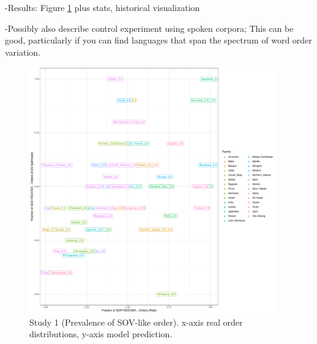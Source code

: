 \documentclass[11pt,a4paper]{article}
\begin{document}
-Results: Figure \ref{fig:study1} plus stats, historical visualization


-Possibly also describe control experiment using spoken corpora; {\color{blue} This can be good, particularly if you can find languages that span the spectrum of word order variation.}



\begin{figure}
    \centering
    \includegraphics[width=0.95\textwidth]{figures/fracion-optimized_DLM_2.6.pdf}
    \caption{Study 1 (Prevalence of SOV-like order). x-axis real order distributions, y-axis model prediction.}
    \label{fig:study1}
\end{figure}
\end{document}
